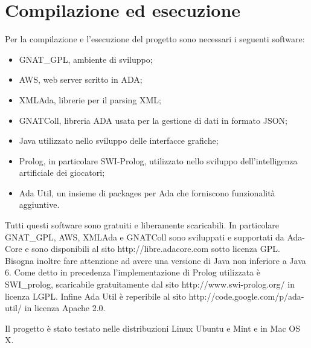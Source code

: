 
\section*{Compilazione ed esecuzione}
%
\label{sec:compilazione_esecuzione}
Per la compilazione e l'esecuzione del progetto sono necessari i seguenti software:
\begin{itemize}
\item GNAT_GPL, ambiente di sviluppo;
\item AWS, web server scritto in ADA;
\item XMLAda, librerie per il parsing XML;
\item GNATColl, libreria ADA usata per la gestione di dati in formato JSON; 
\item Java utilizzato nello sviluppo delle interfacce grafiche;
\item Prolog, in particolare SWI-Prolog, utilizzato nello sviluppo dell'intelligenza artificiale dei giocatori;
\item Ada Util, un insieme di packages per Ada che forniscono funzionalit\`{a} aggiuntive.
\end{itemize}
\noindent Tutti questi software sono gratuiti e liberamente scaricabili. In particolare GNAT_GPL, AWS, XMLAda e GNATColl sono sviluppati e supportati da Ada-Core e sono disponibili al sito http://libre.adacore.com sotto licenza GPL. Bisogna inoltre fare attenzione ad avere una versione di Java non inferiore a Java 6. Come detto in precedenza l'implementazione di Prolog utilizzata \`{e} SWI_prolog, scaricabile gratuitamente dal sito http://www.swi-prolog.org/ in licenza LGPL. Infine Ada Util \`{e} reperibile al sito http://code.google.com/p/ada-util/ in licenza Apache 2.0. 

Il progetto \`{e} stato testato nelle distribuzioni Linux Ubuntu e Mint e in Mac OS X.

